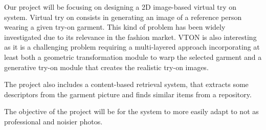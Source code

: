 Our project will be focusing on designing a 2D image-based virtual try on system. Virtual try on consists in generating an image of a reference person wearing a given try-on garment. This kind of problem has been widely investigated due to its relevance in the fashion market. VTON is also interesting as it is a challenging problem requiring a multi-layered approach incorporating at least both a geometric transformation module to warp the selected garment and a generative try-on module that creates the realistic try-on images.

The project also includes a content-based retrieval system, that extracts some descriptors from the garment picture and finds similar items from a repository.

The objective of the project will be for the system to more easily adapt to not as professional and noisier photos.